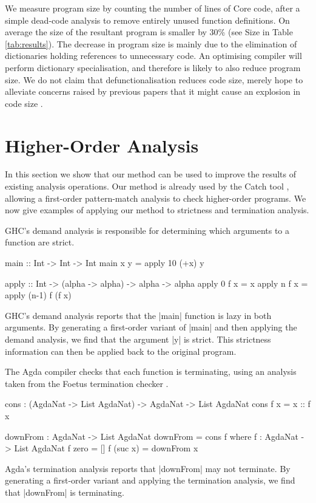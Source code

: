 \documentclass[preprint]{sigplanconf}
\begin{document}
We measure program size by counting the number of lines of Core code, after a simple dead-code analysis to remove entirely unused function definitions. On average the size of the resultant program is smaller by 30\% (see Size in Table \ref{tab:results}). The decrease in program size is mainly due to the elimination of dictionaries holding references to unnecessary code. An optimising compiler will perform dictionary specialisation, and therefore is likely to also reduce program size. We do not claim that defunctionalisation reduces code size, merely hope to alleviate concerns raised by previous papers that it might cause an explosion in code size \cite{chin:higher_order_removal}.

\section{Higher-Order Analysis}
\label{sec:strictness}

In this section we show that our method can be used to improve the results of existing analysis operations. Our method is already used by the Catch tool \cite{me:catch}, allowing a first-order pattern-match analysis to check higher-order programs. We now give examples of applying our method to strictness and termination analysis.

\begin{example}
GHC's demand analysis \cite{ghc} is responsible for determining which arguments to a function are strict.

\begin{code}
main :: Int -> Int -> Int
main x y = apply 10 (+x) y

apply :: Int -> (alpha -> alpha) -> alpha -> alpha
apply 0 f x = x
apply n f x = apply (n-1) f (f x)
\end{code}

GHC's demand analysis reports that the |main| function is lazy in both arguments. By generating a first-order variant of |main| and then applying the demand analysis, we find that the argument |y| is strict. This strictness information can then be applied back to the original program.
\end{example}

\begin{example}
The Agda compiler \cite{agda} checks that each function is terminating, using an analysis taken from the Foetus termination checker \cite{abel:foetus}.

\ignore\begin{code}
cons : (AgdaNat -> List AgdaNat) -> AgdaNat -> List AgdaNat
cons f x = x :: f x

downFrom : AgdaNat -> List AgdaNat
downFrom = cons f
    where  f : AgdaNat -> List AgdaNat
           f zero     = []
           f (suc x)  = downFrom x
\end{code}

Agda's termination analysis reports that |downFrom| may not terminate. By generating a first-order variant and applying the termination analysis, we find that |downFrom| is terminating.
\end{example}
\smallskip
\end{document}
